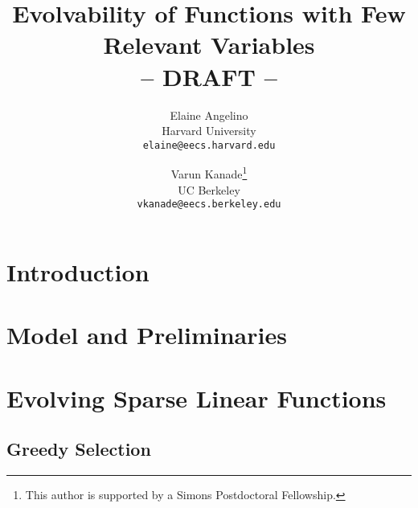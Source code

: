 \documentclass[11pt]{article}
\begin{document}
\title{Evolvability of Functions with Few Relevant Variables \\ 
\small{ -- DRAFT -- }}
\author{Elaine Angelino \\
Harvard University \\ \texttt{elaine@eecs.harvard.edu} \and Varun
Kanade\thanks{This author is supported by a Simons Postdoctoral Fellowship.} \\
UC Berkeley \\ \texttt{vkanade@eecs.berkeley.edu}}

\maketitle

\begin{abstract}

\end{abstract}

\newpage

\section{Introduction}
\label{sec:introduction}


\section{Model and Preliminaries}
\label{sec:notation}


\section{Evolving Sparse Linear Functions}
\label{sec:algorithms}


\subsection{Greedy Selection}
\label{sec:greedy}


% 
% 
% 
\end{document}
